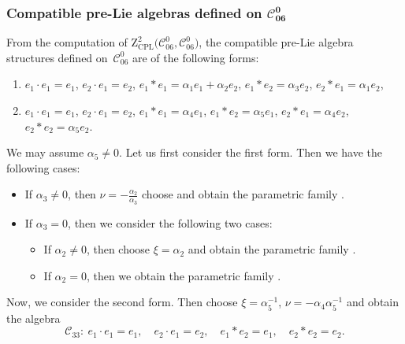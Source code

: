 \documentclass[pdftex]{sigma}
\numberwithin{equation}{section}
\begin{document}
\subsubsection[Compatible pre-Lie algebras defined on C\_\{06\}\^{}0]{Compatible pre-Lie algebras defined on $\boldsymbol{\mathcal{C}_{06}^{0}}$}

From the computation of $\mathrm{Z}_{\mathrm{CPL}}^{2}\bigl(\mathcal{C}_{06}^{0},%
\mathcal{C}_{06}^{0}\bigr)$, the compatible pre-Lie algebra structures defined on~$\mathcal{C}_{06}^{0}$ are of the following forms:
\begin{enumerate}\itemsep=0pt
\item[(1)] $e_{1}\cdot e_{1}=e_{1}$, $e_{2}\cdot e_{1}=e_{2}$,
$e_{1}\ast e_{1}=\alpha _{1}e_{1}+\alpha _{2}e_{2}$, $e_{1}\ast
e_{2}=\alpha _{3}e_{2}$, $e_{2}\ast e_{1}=\alpha _{1}e_{2}$,

\item[(2)] $e_{1}\cdot e_{1}=e_{1}$, $e_{2}\cdot e_{1}=e_{2}$,
$e_{1}\ast e_{1}=\alpha _{4}e_{1}$, $e_{1}\ast e_{2}=\alpha _{5}e_{1}$, $
e_{2}\ast e_{1}=\alpha _{4}e_{2}$, $e_{2}\ast e_{2}=\alpha _{5}e_{2}$.
\end{enumerate}

We may assume $\alpha _{5}\neq 0$.
Let us first consider the first form.
Then we have the following cases:
\begin{itemize}\itemsep=0pt
\item If $\alpha _{3}\neq 0$, then $\nu =-\frac{\alpha _{2}}{\alpha _{3}}$
choose and obtain the parametric family .

\item If $\alpha _{3}=0$, then we consider the following two cases:
\begin{itemize}\itemsep=0pt
\item If $\alpha _{2}\neq 0$, then choose $\xi =\alpha _{2}$ and obtain the
parametric family .
\item If $\alpha _{2}=0$, then we obtain the parametric family .
\end{itemize}
\end{itemize}

Now, we consider the second form. Then choose $\xi ={\alpha^{-1} _{5}}$, $\nu =-{\alpha _{4}}{\alpha^{-1} _{5}}$ and obtain the algebra
\[
{\mathcal{C}_{33}}\colon \
e_{1}\cdot e_{1}=e_{1}, \quad e_{2}\cdot e_{1}=e_{2}, \quad
e_{1}\ast e_{2}=e_{1}, \quad e_{2}\ast e_{2}=e_{2}.
\]
\end{document}
